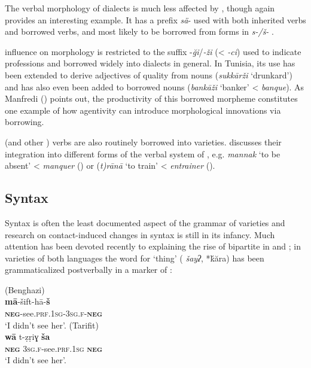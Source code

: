 \documentclass[output=paper]{langsci/langscibook}
\begin{document}
  The verbal morphology of  dialects is much less affected by , though  again provides an interesting example. It has a  prefix \textit{sä}- used with both inherited  verbs and borrowed  verbs, and most likely to be borrowed from   forms in \textit{s-/š-} \citep{Taine-Cheikh2008chapter}.

   influence on morphology is restricted to the suffix -\textit{ği}/\textit{{}-ži} (< \textit{{}-ci}) used to indicate professions and borrowed widely into  dialects in general. In Tunisia, its use has been extended to derive adjectives of quality from nouns (\textit{sukkārži} ‘drunkard’) and has also even been added to borrowed  nouns (\textit{bankāži} ‘banker’ <  \textit{banque}). As Manfredi (\citeyear[410]{Manfredi2018}) points out, the productivity of this borrowed  morpheme constitutes one example of how  agentivity can introduce morphological innovations via borrowing.

   (and other ) verbs are also routinely borrowed into  varieties. \citet{Talmoudi1986} discusses their integration into different forms of the verbal system of  , e.g. \textit{mannak} `to be absent' <  \textit{manquer} (\citeyear[81--82]{Talmoudi1986}) or (\textit{t)rānā} `to train' <  \textit{entrainer} (\citeyear[21--24]{Talmoudi1986}).

\subsection{ Syntax}

Syntax is often the least documented aspect of the grammar of   varieties and research on contact-induced changes in syntax is still in its infancy. Much attention has been devoted recently to explaining the rise of bipartite  in  and ; in varieties of both languages the word for ‘thing’ ( \textit{šayʔ},  *ḱăra) has been grammaticalized postverbally in a marker of :


\ea
{} (Benghazi)\\
\gll \textbf{mā}-šift-hā-\textbf{š}\\
     \textbf{\textsc{neg}}-see.\textsc{prf}.\textsc{1sg}-\textsc{3sg.f}-\textbf{\textsc{neg}}\\
\glt `I didn’t see her'.
\z
\ea {} (Tarifit)\\
\gll \textbf{wā}  t-ẓṛiɣ  \textbf{ša}\\
     \textbf{\textsc{neg}}  \textsc{3sg.f}-see.\textsc{prf}.\textsc{1sg}  \textbf{\textsc{neg}}\\
\glt `I didn’t see her'.
\z
\end{document}
